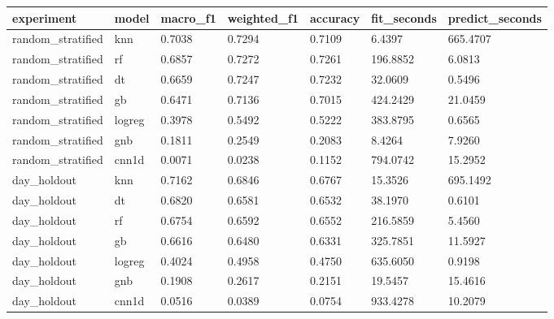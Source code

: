 \begin{tabular}{lllllll}
\toprule
       experiment &  model & macro\_f1 & weighted\_f1 & accuracy & fit\_seconds & predict\_seconds \\
\midrule
random\_stratified &    knn &   0.7038 &      0.7294 &   0.7109 &      6.4397 &        665.4707 \\
random\_stratified &     rf &   0.6857 &      0.7272 &   0.7261 &    196.8852 &          6.0813 \\
random\_stratified &     dt &   0.6659 &      0.7247 &   0.7232 &     32.0609 &          0.5496 \\
random\_stratified &     gb &   0.6471 &      0.7136 &   0.7015 &    424.2429 &         21.0459 \\
random\_stratified & logreg &   0.3978 &      0.5492 &   0.5222 &    383.8795 &          0.6565 \\
random\_stratified &    gnb &   0.1811 &      0.2549 &   0.2083 &      8.4264 &          7.9260 \\
random\_stratified &  cnn1d &   0.0071 &      0.0238 &   0.1152 &    794.0742 &         15.2952 \\
      day\_holdout &    knn &   0.7162 &      0.6846 &   0.6767 &     15.3526 &        695.1492 \\
      day\_holdout &     dt &   0.6820 &      0.6581 &   0.6532 &     38.1970 &          0.6101 \\
      day\_holdout &     rf &   0.6754 &      0.6592 &   0.6552 &    216.5859 &          5.4560 \\
      day\_holdout &     gb &   0.6616 &      0.6480 &   0.6331 &    325.7851 &         11.5927 \\
      day\_holdout & logreg &   0.4024 &      0.4958 &   0.4750 &    635.6050 &          0.9198 \\
      day\_holdout &    gnb &   0.1908 &      0.2617 &   0.2151 &     19.5457 &         15.4616 \\
      day\_holdout &  cnn1d &   0.0516 &      0.0389 &   0.0754 &    933.4278 &         10.2079 \\
\bottomrule
\end{tabular}
